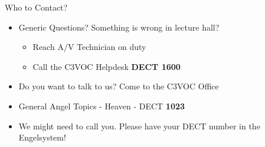 
\begin{frame}{Who to Contact?}
	\begin{itemize}
		\item Generic Questions? Something is wrong in lecture hall?
		\begin{itemize}
			\item Reach A/V Technician on duty
			\item Call the C3VOC Helpdesk \textbf{DECT 1600}
		\end{itemize}
		\item Do you want to talk to us? Come to the C3VOC Office
		\item General Angel Topics - Heaven - DECT \textbf{1023}
		\item We might need to call you. Please have your DECT number in the Engelsystem!
	\end{itemize}
\end{frame}
